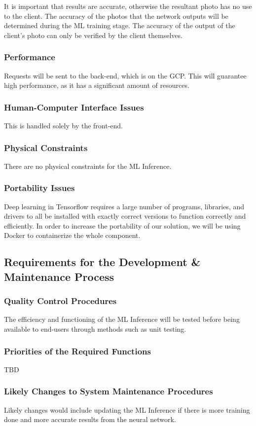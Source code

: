 \documentclass[12pt]{article}
\begin{document}
It is important that results are accurate, otherwise the resultant photo has no use to the client. The accuracy of the photos that the network outputs will be determined during the ML training stage. The accuracy of the output of the client's photo can only be verified by the client themselves.

\subsubsection {Performance}

Requests will be sent to the back-end, which is on the GCP. This will guarantee high performance, as it has a significant amount of resources.

\subsubsection {Human-Computer Interface Issues}

This is handled solely by the front-end.

\subsubsection {Physical Constraints}

There are no physical constraints for the ML Inference.

\subsubsection {Portability Issues}

Deep learning in Tensorflow requires a large number of programs, libraries, and drivers to all be installed with exactly correct versions to function correctly and efficiently. In order to increase the portability of our solution, we will be using Docker to containerize the whole component.

\subsection{Requirements for the Development \&\\ Maintenance Process}

\subsubsection {Quality Control Procedures}

The efficiency and functioning of the ML Inference will be tested before being available to end-users through methods such as unit testing.

\subsubsection {Priorities of the Required Functions}

TBD

\subsubsection {Likely Changes to System Maintenance Procedures}

Likely changes would include updating the ML Inference if there is more training done and more accurate results from the neural network.
\end{document}
